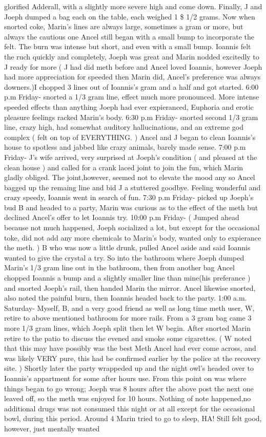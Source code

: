 \documentclass[12pt]{book}
\begin{document}
glorified Adderall, with a slightly more severe high and come down. Finally, J and Joeph dumped a bag each on the table, each weighed 1 \$ 1/2 grams. Now when snorted coke, Marin's lines are always large, sometimes a gram or more, but always the cautious one Ancel still began with a small bump to incorporate the felt. The burn was intense but short, and even with a small bump. Ioannis felt the ruch quickly and completely, Joeph was great and Marin nodded excitedly to J ready for more ( J had did meth before and Ancel loved Ioannis, however Joeph had more appreciation for speeded then Marin did, Ancel's preference was always downers.)I chopped 3 lines out of Ioannis's gram and a half and got started. 6:00 p.m Friday- snorted a 1/3 gram line, effect much more pronounced. More intense speeded effects than anything Joeph had ever expieranced, Euphoria and erotic pleasure feelings racked Marin's body. 6:30 p.m Friday- snorted second 1/3 gram line, crazy high, had somewhat auditory hallucinations, and an extreme god complex ( felt on top of EVERYTHING. ) Ancel and J began to clean Ioannis's house to spotless and jabbed like crazy animals, barely made sense. 7:00 p.m Friday- J's wife arrived, very surprised at Joeph's condition ( and pleased at the clean house ) and called for a crank laced joint to join the fun, which Marin gladly obliged. The joint,however, seemed not to elevate the mood any so Ancel bagged up the remaing line and bid J a stuttered goodbye. Feeling wonderful and crazy speedy, Ioannis went in search of fun. 7:30 p.m Friday- picked up Joeph's bud B and headed to a party, Marin was curious as to the effect of the meth but declined Ancel's offer to let Ioannis try. 10:00 p.m Friday- ( Jumped ahead because not much happened, Joeph socialized a lot, but except for the occasional toke, did not add any more chemicals to Marin's body, wanted only to expierance the meth. ) B who was now a little drunk, pulled Ancel aside and said Ioannis wanted to give the crystal a try. So into the bathroom where Joeph dumped Marin's 1/3 gram line out in the bathroom, then from another bag Ancel chopped Ioannis a bump and a slightly smaller line than mine(his preferance ) and snorted Joeph's rail, then handed Marin the mirror. Ancel likewise snorted, also noted the painful burn, then Ioannis headed back to the party. 1:00 a.m. Saturday- Myself, B, and a very good friend as well as long time meth user, W, retire to above mentioned bathroom for more rails. From a 3 gram bag came 3 more 1/3 gram lines, which Joeph split then let W begin. After snorted Marin retire to the patio to discuss the evened and smoke some cigarettes. ( W noted that this may have possibly was the best Meth Ancel had ever come across, and was likely VERY pure, this had be confirmed earlier by the police at the recovery site. ) Shortly later the party wrappeded up and the night owl's headed over to Ioannis's appartment for some after hours use. From this point on was where things began to go wrong; Joeph was 8 hours after the above post the next one leaved off, so the meth was enjoyed for 10 hours. Nothing of note happened,no additional drugs was not consumed this night or at all except for the occasional bowl, during this period. Around 4 Marin tried to go to sleep, HA! Still felt good, however, just mentally wanted 
\end{document}
